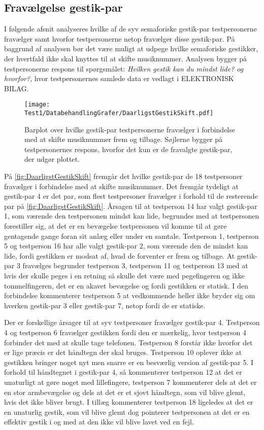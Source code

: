 \subsection{Fravælgelse gestik-par}
\label{TestresultaterSkiftDaarlig}
%
I følgende afsnit analyseres hvilke af de syv semaforiske gestik-par testpersonerne fravælger samt hvorfor testpersonerne netop fravælger disse gestik-par. På baggrund af analysen bør det være muligt at udpege hvilke semaforiske gestikker, der hvertfald ikke skal knyttes til at skifte musiknummer. Analysen bygger på testpersonerne respons til spørgsmålet: \textit{Hvilken gestik kan du mindst lide? og hvorfor?}, hvor testpersonernes samlede data er vedlagt i ELEKTRONISK BILAG.
%
\begin{figure}[H]
	\centering
	\texttt{[image: Test1/DatabehandlingGrafer/DaarligstGestikSkift.pdf]}
	\caption{Barplot over hvilke gestik-par testpersonerne fravælger i forbindelse med at skifte musiknummer frem og tilbage. Søjlerne bygger på testpersonernes respons, hvorfor det kun er de fravalgte gestik-par, der udgør plottet.}
	\label{fig:DaarligstGestikSkift}
\end{figure}
\noindent
%
På \autoref{fig:DaarligstGestikSkift} fremgår det hvilke gestik-par de 18 testpersoner fravælger i forbindelse med at skifte musiknummer. Det fremgår tydeligt at gestik-par 4 er det par, som flest testpersoner fravælger i forhold til de resterende par på \autoref{fig:DaarligstGestikSkift}. Årsagen til at testperson 14 har valgt gestik-par 1, som værende den testpersonen mindst kan lide, begrundes med at testpersonen forestiller sig, at det er en bevægelse testpersonen vil komme til at gøre gentagende gange foran sit anlæg eller under en samtale. Testperson 1, testperson 5 og testperson 16 har alle valgt gestik-par 2, som værende den de mindst kan lide, fordi gestikken er modsat af, hvad de forventer er frem og tilbage. At gestik-par 3 fravælges begrunder testperson 3, testperson 11 og testperson 13 med at hvis der skulle peges i en retning så skulle det være med pegefingeren og ikke tommelfingeren, det er en akavet bevægelse og fordi gestikken er statisk. I den forbindelse kommenterer testperson 5 at vedkommende heller ikke bryder sig om hverken gestik-par 3 eller gestik-par 7, netop fordi de er statiske.

Der er forskellige årsager til at syv testpersoner fravælger gestik-par 4. Testperson 4 og testperson 6 fravælger gestikken fordi den er mærkelig, hvor testperson 4 forbinder det med at skulle tage telefonen. Testperson 8 forstår ikke hvorfor det er lige præcis er det håndtegn der skal bruges. Testperson 10 oplever ikke at gestikken bringer noget nyt men snarre er en besværlig version af gestik-par 5. I forhold til håndtegnet i gestik-par 4, så kommenterer testperson 12 at det er unaturligt at gøre noget med lillefingere, testperson 7 kommenterer dels at det er en stor armbevægelse og dels at det er et sjovt håndtegn, som vil blive glemt, hvis det ikke bliver brugt. I tillæg kommenterer testperson 18 ligeledes at det er en unaturlig gestik, som vil blive glemt dog pointerer testpersonen at det er en effektiv gestik i og med at den ikke vil blive lavet ved en fejl. 

